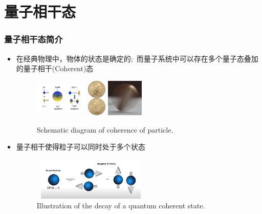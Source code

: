 \section{量子相干态}
\begin{frame}
    \frametitle{量子相干态简介}
    \begin{itemize}
	    \item 在经典物理中，物体的状态是确定的;~而量子系统中可以存在多个量子态叠加的量子相干\textrm{(Coherent)}态
            \begin{figure}
        \centering
                \includegraphics[height=0.7in, width=1.0in, viewport=0 0 460 330,clip]{Figures/Illustration-of-a-bit_and_qubit.png}
		\hspace{0.1in}
                \includegraphics[height=0.7in, width=0.35in, viewport=0 0 85 170,clip]{Figures/American_Eagle_gold_coin_2019_2.jpg}
                \includegraphics[height=0.7in, width=0.7in, viewport=0 0 150 151,clip]{Figures/Coin-spin.jpg}
		\caption{\tiny{\textrm{Schematic diagram of coherence of particle.}}}
		\label{Fig:Schematic-Coherence-of-particle}
            \end{figure}
	    \vskip -0.24in
	    {\fontsize{8.5pt}{5.2pt}\selectfont{\textcolor{magenta}{叠加态之间存在确定的相位关系}}}
        \item 量子相干使得粒子可以同时处于多个状态
            \begin{figure}
        \centering
                \includegraphics[height=0.8in, width=2.2in, viewport=0 0 720 283,clip]{Figures/Schematic-Coherence-of-particle.jpeg}
		\caption{\tiny{\textrm{Illustration of the decay of a quantum coherent state.}}}
		\label{Fig:Illustration-of-a-bit_and_qubit}
            \end{figure}
    \end{itemize}
\end{frame}

